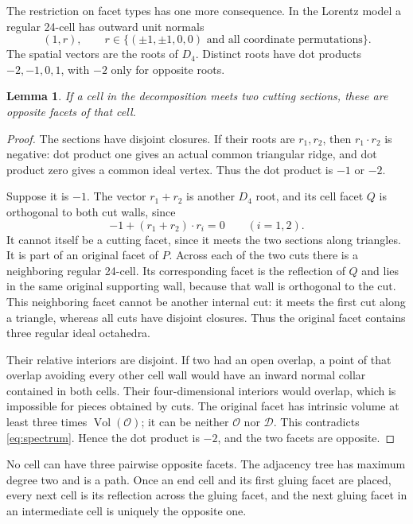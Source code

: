 \documentclass[11pt]{article}
\newtheorem{lemma}[theorem]{Lemma}
\theoremstyle{remark}
\newcommand{\Vol}{\operatorname{Vol}}
\newcommand{\OCT}{\mathcal O}
\newcommand{\DBL}{\mathcal D}
\begin{document}
The restriction on facet types has one more consequence. In the
Lorentz model a regular 24-cell has outward unit normals
\[
 (1,r),\qquad
 r\in\{(\pm1,\pm1,0,0)\text{ and all coordinate permutations}\}.
\]
The spatial vectors are the roots of $D_4$. Distinct roots have
dot products $-2,-1,0,1$, with $-2$ only for opposite roots.

\begin{lemma}\label{lem:opposite}
If a cell in the decomposition meets two cutting sections,
these are opposite facets of that cell.
\end{lemma}
\begin{proof}
The sections have disjoint closures. If their roots are $r_1,r_2$,
then $r_1\cdot r_2$ is negative: dot product one gives an actual
common triangular ridge, and dot product zero gives a common
ideal vertex. Thus the dot product is $-1$ or $-2$.

Suppose it is $-1$. The vector $r_1+r_2$ is another $D_4$ root,
and its cell facet $Q$ is orthogonal to both cut walls, since
\[
 -1+(r_1+r_2)\cdot r_i=0\qquad(i=1,2).
\]
It cannot itself be a cutting facet, since it meets the two
sections along triangles. It is part of an original facet of $P$.
Across each of the two cuts there is a neighboring regular
24-cell. Its corresponding facet is the reflection of $Q$ and
lies in the same original supporting wall, because that wall is
orthogonal to the cut. This neighboring facet cannot be another
internal cut: it meets the first cut along a triangle, whereas
all cuts have disjoint closures. Thus the original facet contains
three regular ideal octahedra.

Their relative interiors are disjoint. If two had an open
overlap, a point of that overlap avoiding every other cell wall
would have an inward normal collar contained in both cells.
Their four-dimensional interiors would overlap, which is
impossible for pieces obtained by cuts. The original facet has
intrinsic volume at least three times $\Vol(\OCT)$; it can be
neither $\OCT$ nor $\DBL$. This contradicts
\eqref{eq:spectrum}. Hence the dot product is $-2$, and the two
facets are opposite.
\end{proof}

No cell can have three pairwise opposite facets. The adjacency
tree has maximum degree two and is a path. Once an end cell and
its first gluing facet are placed, every next cell is its
reflection across the gluing facet, and the next gluing facet in
an intermediate cell is uniquely the opposite one.
\end{document}

